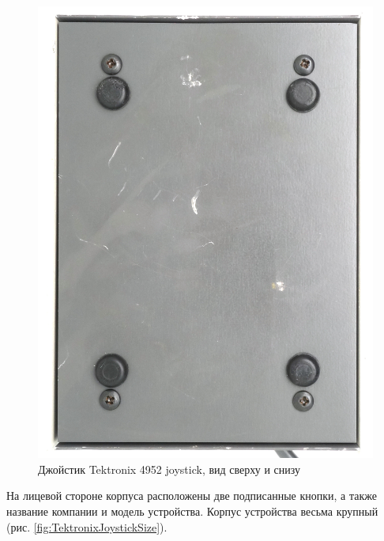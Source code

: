 \documentclass[11pt, a4paper]{article}
\begin{document}
\begin{figure}[h]
    \includegraphics[scale=0.3]{1975_Tektronix_4952_Joystick/bottom_30.jpg}
    \caption{Джойстик Tektronix 4952 joystick, вид сверху и снизу}
    \label{fig:TektronixJoystickTopAndBottom}
\end{figure}

На лицевой стороне корпуса расположены две подписанные кнопки, а также название компании и модель устройства.
Корпус устройства весьма крупный (рис. \ref{fig:TektronixJoystickSize}).
\end{document}
